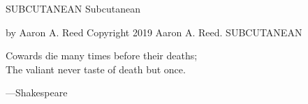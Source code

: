\thispagestyle{empty}
SUBCUTANEAN
\clearpage
\thispagestyle{empty}
\null %
\clearpage
\thispagestyle{empty}
Subcutanean

by Aaron A. Reed
\clearpage
\thispagestyle{empty}
\null\vfill
Copyright 2019 Aaron A. Reed.
\clearpage
\thispagestyle{empty}
SUBCUTANEAN
\clearpage
\cleartorecto
\thispagestyle{empty}
\vspace*{10\nbs}
\begin{adjustwidth}{7em}{7em}
Cowards die many times before their deaths;\\
The valiant never taste of death but once.\par
\stake\hfill---Shakespeare\par
\end{adjustwidth}

\clearpage
\mainmatter %

